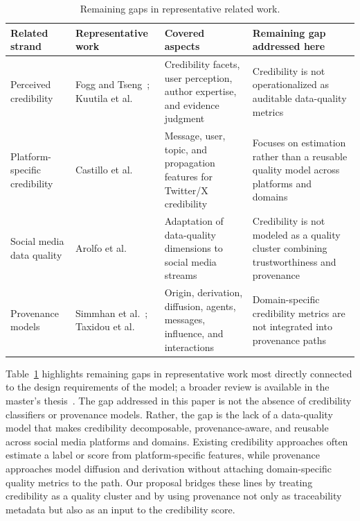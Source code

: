\documentclass[sigconf, nonacm]{acmart}
\begin{document}
\begin{table}[t]
  \caption{Remaining gaps in representative related work.}
  \label{tab:related-gap}
  \small
  \begin{tabular}{@{}p{}p{}p{}p{}@{}}
    \toprule
    Related strand & Representative work & Covered aspects & Remaining gap addressed here\\
    \midrule
    Perceived credibility
      & Fogg and Tseng~\cite{FoggTseng1999}; Kuutila et al.~\cite{Kuutila2024}
      & Credibility facets, user perception, author expertise, and evidence judgment
      & Credibility is not operationalized as auditable data-quality metrics\\
    Platform-specific credibility
      & Castillo et al.~\cite{Castillo2011}
      & Message, user, topic, and propagation features for Twitter/X credibility
      & Focuses on estimation rather than a reusable quality model across platforms and domains\\
    Social media data quality
      & Arolfo et al.~\cite{Arolfo2020}
      & Adaptation of data-quality dimensions to social media streams
      & Credibility is not modeled as a quality cluster combining trustworthiness and provenance\\
    Provenance models
      & Simmhan et al.~\cite{Simmhan2005}; Taxidou et al.~\cite{Taxidou2015}
      & Origin, derivation, diffusion, agents, messages, influence, and interactions
      & Domain-specific credibility metrics are not integrated into provenance paths\\
    \bottomrule
  \end{tabular}
\end{table}

Table~\ref{tab:related-gap} highlights remaining gaps in representative work
most directly connected to the design requirements of the model; a broader
review is available in the master's thesis~\cite{GarciaParra2024Thesis}. The gap
addressed in this paper is not the absence of credibility classifiers or
provenance models. Rather, the gap is the lack of a data-quality model that makes
credibility decomposable, provenance-aware, and reusable across social media
platforms and domains. Existing credibility approaches often estimate a label or
score from platform-specific features, while provenance approaches model
diffusion and derivation without attaching domain-specific quality metrics to the
path. Our proposal bridges these lines by treating credibility as a quality
cluster and by using provenance not only as traceability metadata but also as an
input to the credibility score.
\end{document}
